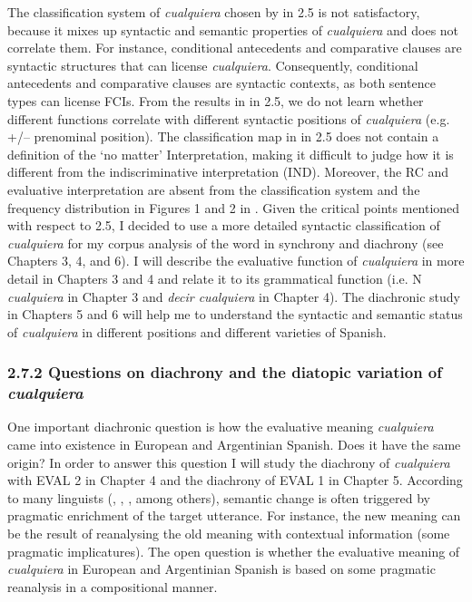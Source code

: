 \documentclass[output=paper]{langscibook}
\begin{document}
  The classification system of \textit{cualquiera} chosen by \citet{AloniEtAl2010} in 2.5 is not satisfactory, because it mixes up syntactic and semantic properties of \textit{cualquiera} and does not correlate them. For instance, conditional antecedents and comparative clauses are syntactic structures that can license \textit{cualquiera}. Consequently, conditional antecedents and comparative clauses are syntactic contexts, as both sentence types can license FCIs. From the results in  in 2.5, we do not learn whether different functions correlate with different syntactic positions of \textit{cualquiera} (e.g. +/– prenominal position). The classification map in  in 2.5 does not contain a definition of the ‘no matter’ Interpretation, making it difficult to judge how it is different from the indiscriminative interpretation (IND). Moreover, the RC and evaluative interpretation are absent from the classification system and the frequency distribution in Figures 1 and 2 in . Given the critical points mentioned with respect to 2.5, I decided to use a more detailed syntactic classification of \textit{cualquiera} for my corpus analysis of the word in synchrony and diachrony (see Chapters 3, 4, and 6). I will describe the evaluative function of \textit{cualquiera} in more detail in Chapters 3 and 4 and relate it to its grammatical function (i.e. N \textit{cualquiera} in Chapter 3 and \textit{decir cualquiera} in Chapter 4). The diachronic study in Chapters 5 and 6 will help me to understand the syntactic and semantic status of \textit{cualquiera} in different positions and different varieties of Spanish. 

\subsubsection{\textbf{2.7.2} \textbf{Questions} \textbf{on} \textbf{diachrony} \textbf{and} \textbf{the} \textbf{diatopic} \textbf{variation} \textbf{of} \textbf{\textit{cualquiera}}}

One important diachronic question is how the evaluative meaning \textit{cualquiera} came into existence in European and Argentinian Spanish. Does it have the same origin? In order to answer this question I will study the diachrony of \textit{cualquiera} with EVAL 2 in Chapter 4 and the diachrony of EVAL 1 in Chapter 5. According to many linguists (\citealt{Blank1997}, \citealt{Traugott1989}, \citealt{Eckardt2006}, among others), semantic change is often triggered by pragmatic enrichment of the target utterance. For instance, the new meaning can be the result of reanalysing the old meaning with contextual information (some pragmatic implicatures). The open question is whether the evaluative meaning of \textit{cualquiera} in European and Argentinian Spanish is based on some pragmatic reanalysis in a compositional manner. 
\end{document}
